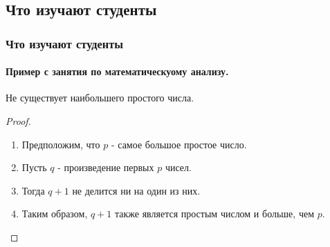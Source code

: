 \subsection{Что изучают студенты}

\begin{frame}
  \frametitle{Что изучают студенты}
  \framesubtitle{Пример с занятия по математическуому анализу.}
  \begin{thm} 
    Не существует наибольшего простого числа.
  \end{thm}
  \begin{proof}
    \begin{enumerate}
      \item<1-| alert@1> Предположим, что $p$ - самое большое простое число.
      \item<2-> Пусть $q$ - произведение первых $p$ чисел.
      \item<3-> Тогда $q+1$ не делится ни на один из них.
      \item<1-> Таким образом, $q +1$ также является простым числом и больше, чем $p$.\qedhere
    \end{enumerate}
  \end{proof}
\end{frame}
